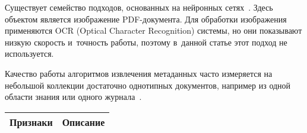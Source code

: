 \begin{multicols}{2}
Существует семейство подходов, основанных на нейронных 
сетях~\cite{Rangoni, Rangoni_1}. Здесь объектом является изображение PDF-до\-ку\-мен\-та. 
Для обработки 
изображения применяются OCR (Optical Character Recognition) сис\-те\-мы, но они показывают низкую скорость 
и~точ\-ность работы, поэтому в~данной \mbox{статье} этот подход не используется.

Качество работы алгоритмов извлечения метаданных час\-то измеряется на небольшой 
коллекции достаточно однотипных документов, например из одной об\-ласти знания 
или одного журнала~\cite{Kovacevic, Tao}.

\begin{table*}[b]\small %
    \begin{center}
\label{tab:table1}
\vspace*{2ex}


    \begin{tabular}{|c|l|l|} %
        \hline
\multicolumn{2}{|c|}{Признаки} & \multicolumn{1}{c|}{Описание} \\
\hline


\end{tabular}
\end{center}
\end{table*}
\end{multicols}
